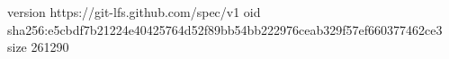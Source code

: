version https://git-lfs.github.com/spec/v1
oid sha256:e5cbdf7b21224e40425764d52f89bb54bb222976ceab329f57ef660377462ce3
size 261290
